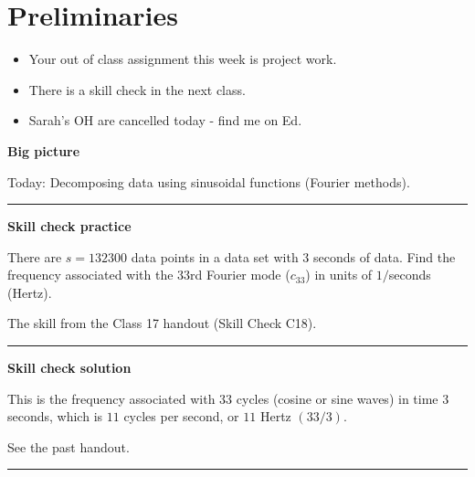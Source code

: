 \documentclass[12pt,letterpaper,noanswers]{exam}
\begin{document}
 \pdfpageheight 11in 
  \pdfpagewidth 8.5in

\noindent 

\section*{Preliminaries}

\begin{itemize}
\itemsep0pt
\item Your out of class assignment this week is project work.
\item There is a skill check in the next class.
\item Sarah's OH are cancelled today - find me on Ed.
\end{itemize}


\noindent\textbf{Big picture}

Today: Decomposing data using sinusoidal functions (Fourier methods).

\vspace{0.2cm}
\hrule
\vspace{0.2cm}

\noindent \textbf{Skill check practice}
\begin{questions}
\item There are $s = 132300$ data points in a data set with $3$ seconds of data.  Find the frequency associated with the $33$rd Fourier mode ($c_{33}$) in units of $1/$seconds (Hertz).

\item The skill from the Class 17 handout (Skill Check C18).
\end{questions}


\vspace{0.2cm}
\hrule
\vspace{0.2cm}

\noindent \textbf{Skill check solution}
\begin{questions}
\item This is the frequency associated with $33$ cycles (cosine or sine waves) in time $3$ seconds, which is $11$ cycles per second, or $11$ Hertz $(33/3)$.
\item See the past handout.
\end{questions}
\vspace{0.2cm}
\hrule
\vspace{0.2cm}
\end{document}
